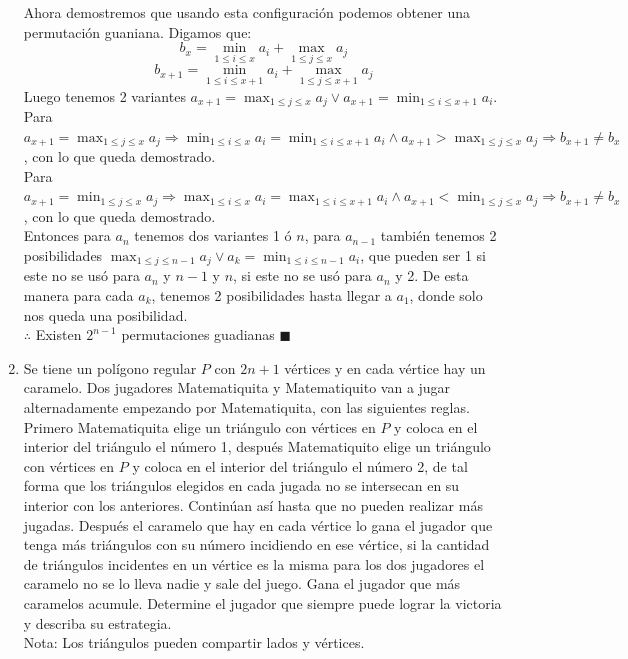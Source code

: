 \documentclass{book}
\begin{document}
\begin{enumerate}
        Ahora demostremos que usando esta configuración podemos obtener una permutación guaniana. Digamos que:
        $$b_x=\min_{1\leq i\leq x}a_i+\max_{1\leq j\leq x} a_j$$
        $$b_{x+1}=\min_{1\leq i\leq x+1}a_i+\max_{1\leq j\leq x+1} a_j$$
        Luego tenemos 2 variantes $a_{x+1}=\max_{1\leq j\leq x} a_j\vee a_{x+1}=\min_{1\leq i\leq x+1}a_i$. \\
        Para $a_{x+1}=\max_{1\leq j\leq x} a_j\Rightarrow \min_{1\leq i\leq x}a_i=\min_{1\leq i\leq x+1}a_i\wedge a_{x+1}>\max_{1\leq j\leq x} a_j\Rightarrow b_{x+1}\neq b_{x}$, con lo que queda demostrado.\\
        Para $a_{x+1}=\min_{1\leq j\leq x} a_j\Rightarrow \max_{1\leq i\leq x}a_i=\max_{1\leq i\leq x+1}a_i\wedge a_{x+1}<\min_{1\leq j\leq x} a_j\Rightarrow b_{x+1}\neq b_{x}$, con lo que queda demostrado.\\
        Entonces para $a_n$ tenemos dos variantes 1 ó $n$, para $a_{n-1}$ también tenemos 2 posibilidades $\max_{1\leq j\leq n-1} a_j\vee a_k=\min_{1\leq i\leq n-1}a_i$, que pueden ser 1 si este no se usó para $a_n$ y $n-1$ y  $n$, si este no se usó para $a_n$ y 2. De esta manera para cada $a_k$, tenemos 2 posibilidades hasta llegar a $a_1$, donde solo nos queda una posibilidad. \\
        $\therefore$ Existen $2^{n-1}$ permutaciones guadianas $\blacksquare$\\
        \item Se tiene un polígono regular $P$ con $2n+1$ vértices y en cada vértice hay un caramelo. Dos jugadores Matematiquita y Matematiquito van a jugar alternadamente empezando por Matematiquita, con las siguientes reglas. Primero Matematiquita elige un triángulo con vértices en $P$ y coloca en el interior del triángulo el número 1, después Matematiquito elige un triángulo con vértices en $P$ y coloca en el interior del triángulo el número 2, de tal forma que los triángulos elegidos en cada jugada no se intersecan en su interior con los anteriores. Continúan así hasta que no pueden realizar más jugadas. Después el caramelo que hay en cada vértice lo gana el jugador que tenga más triángulos con su número incidiendo en ese vértice, si la cantidad de triángulos incidentes en un vértice es la misma para los dos jugadores el caramelo no se lo lleva nadie y sale del juego. Gana el jugador que más caramelos acumule. Determine el jugador que siempre puede lograr la victoria y describa su estrategia.\\
        Nota: Los triángulos pueden compartir lados y vértices.\\

\end{enumerate}
\end{document}
